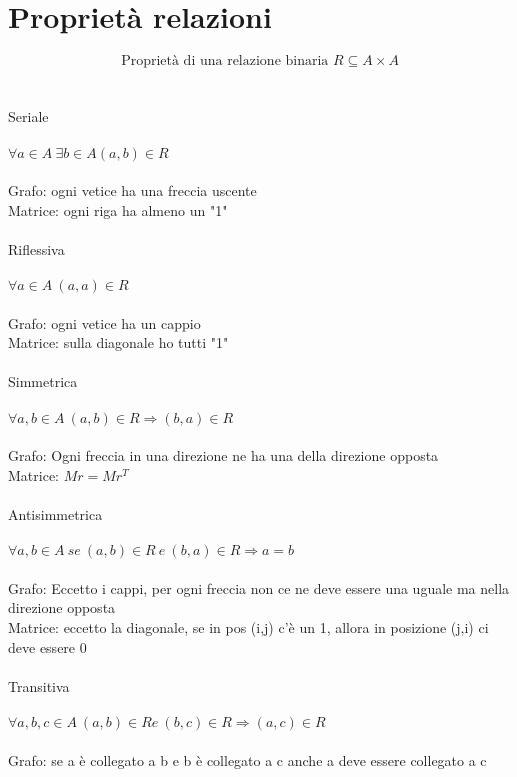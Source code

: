 \documentclass{article}
\begin{document}
	
		
		\section{Proprietà relazioni}
		{\Large\[\text{Proprietà di una relazione binaria  } R\subseteq A \times A\]}
		\\\\
		{\large Seriale}\\\\
		\(\forall a \in A \  \exists b \in A (a,b) \in R\)\\\\
		Grafo: ogni vetice ha una freccia uscente\\
		Matrice: ogni riga ha almeno un "1"\\\\
		{\large Riflessiva}\\\\
		\(\forall a \in A \  (a,a) \in R\)\\\\
		Grafo: ogni vetice ha un cappio\\
		Matrice: sulla diagonale ho tutti "1"\\\\
		{\large Simmetrica}\\\\
		\(\forall a,b \in A \  (a,b) \in R \Rightarrow (b,a)\in R\)\\\\
		Grafo: Ogni freccia in una direzione ne ha una della direzione opposta\\
		Matrice: \(Mr=Mr^T\)\\\\
		{\large Antisimmetrica}\\\\
		\(\forall a,b \in A \  se\ (a,b) \in R \ e\  (b,a)\in R \Rightarrow a=b\)\\\\
		Grafo: Eccetto i cappi, per ogni freccia non ce ne deve essere una uguale ma nella direzione opposta\\
		Matrice: eccetto la diagonale, se in pos (i,j) c'è un 1, allora in posizione (j,i) ci deve essere 0\\\\
		{\large Transitiva}\\\\
		\(\forall a,b,c \in A \  (a,b) \in R e\ (b,c)\in R \Rightarrow (a,c)\in R\)\\\\
		Grafo: se a è collegato a b e b è collegato a c anche a deve essere collegato a c \\\\\\\\
		
\end{document}
